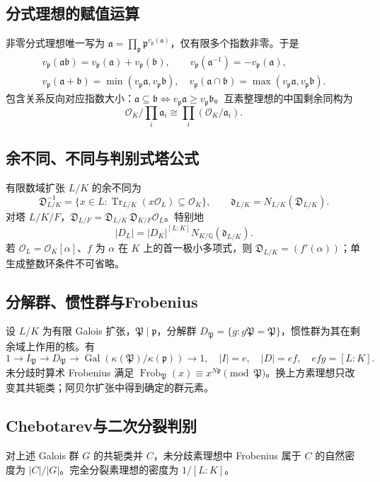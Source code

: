 \documentclass[../main.tex]{subfiles}
\begin{document}
\subsection{分式理想的赋值运算}
非零分式理想唯一写为 $\mathfrak a=\prod_{\mathfrak p}\mathfrak p^{v_{\mathfrak p}(\mathfrak a)}$，仅有限多个指数非零。于是
\begin{gather*}
v_{\mathfrak p}(\mathfrak a\mathfrak b)=v_{\mathfrak p}(\mathfrak a)+v_{\mathfrak p}(\mathfrak b),\qquad
v_{\mathfrak p}(\mathfrak a^{-1})=-v_{\mathfrak p}(\mathfrak a),\\
v_{\mathfrak p}(\mathfrak a+\mathfrak b)=\min(v_{\mathfrak p}\mathfrak a,v_{\mathfrak p}\mathfrak b),\quad
v_{\mathfrak p}(\mathfrak a\cap\mathfrak b)=\max(v_{\mathfrak p}\mathfrak a,v_{\mathfrak p}\mathfrak b).
\end{gather*}
包含关系反向对应指数大小：$\mathfrak a\subseteq\mathfrak b\iff v_{\mathfrak p}\mathfrak a\ge v_{\mathfrak p}\mathfrak b$。互素整理想的中国剩余同构为
\[
\mathcal O_K/\prod_i\mathfrak a_i\cong\prod_i(\mathcal O_K/\mathfrak a_i).
\]
\subsection{余不同、不同与判别式塔公式}
有限数域扩张 $L/K$ 的余不同为
\[
\mathfrak D_{L/K}^{-1}=\{x\in L:\operatorname{Tr}_{L/K}(x\mathcal O_L)\subseteq\mathcal O_K\},\qquad
\mathfrak d_{L/K}=N_{L/K}(\mathfrak D_{L/K}).
\]
对塔 $L/K/F$，$\mathfrak D_{L/F}=\mathfrak D_{L/K}\,\mathfrak D_{K/F}\mathcal O_L$。特别地
\[
|D_L|=|D_K|^{[L:K]}N_{K/\mathbb Q}(\mathfrak d_{L/K}).
\]
若 $\mathcal O_L=\mathcal O_K[\alpha]$、$f$ 为 $\alpha$ 在 $K$ 上的首一极小多项式，则 $\mathfrak D_{L/K}=(f'(\alpha))$；单生成整数环条件不可省略。
\subsection{分解群、惯性群与Frobenius}
设 $L/K$ 为有限 Galois 扩张，$\mathfrak P\mid\mathfrak p$，分解群 $D_{\mathfrak P}=\{g:g\mathfrak P=\mathfrak P\}$，惯性群为其在剩余域上作用的核。有
\[
1\to I_{\mathfrak P}\to D_{\mathfrak P}\to
\operatorname{Gal}(\kappa(\mathfrak P)/\kappa(\mathfrak p))\to1,
\quad |I|=e,\quad|D|=ef,\quad efg=[L:K].
\]
未分歧时算术 Frobenius 满足 $\operatorname{Frob}_{\mathfrak P}(x)\equiv x^{N\mathfrak p}\pmod{\mathfrak P}$。换上方素理想只改变其共轭类；阿贝尔扩张中得到确定的群元素。
\subsection{Chebotarev与二次分裂判别}
对上述 Galois 群 $G$ 的共轭类并 $C$，未分歧素理想中 Frobenius 属于 $C$ 的自然密度为 $|C|/|G|$。完全分裂素理想的密度为 $1/[L:K]$。
\end{document}
